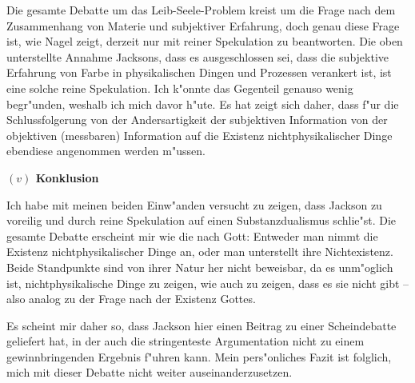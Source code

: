 \documentclass[a4paper, emulatestandardclasses, 12pt]{scrartcl}
\begin{document}
\begin{onehalfspace}
Die gesamte Debatte um das Leib-Seele-Problem kreist um die Frage nach dem Zusammenhang von Materie und subjektiver Erfahrung, doch genau diese Frage ist, wie Nagel zeigt, derzeit nur mit reiner Spekulation zu beantworten. Die oben unterstellte Annahme Jacksons, dass es ausgeschlossen sei, dass die subjektive Erfahrung von Farbe in physikalischen Dingen und Prozessen verankert ist, ist eine solche reine Spekulation. Ich k"onnte das Gegenteil genauso wenig begr"unden, weshalb ich mich davor h"ute. Es hat zeigt sich daher, dass f"ur die Schlussfolgerung von der Andersartigkeit der subjektiven Information von der objektiven (messbaren) Information auf die Existenz nichtphysikalischer Dinge ebendiese angenommen werden m"ussen. 


\vspace{5mm}
\noindent\textbf{$(v)$ Konklusion}

\noindent Ich habe mit meinen beiden Einw"anden versucht zu zeigen, dass Jackson zu voreilig und durch reine Spekulation auf einen Substanzdualismus schlie"st. Die gesamte Debatte erscheint mir wie die nach Gott: Entweder man nimmt die Existenz nichtphysikalischer Dinge an, oder man unterstellt ihre Nichtexistenz. Beide Standpunkte sind von ihrer Natur her nicht beweisbar, da es unm"oglich ist, nichtphysikalische Dinge zu zeigen, wie auch zu zeigen, dass es sie nicht gibt -- also analog zu der Frage nach der Existenz Gottes. 

Es scheint mir daher so, dass Jackson hier einen Beitrag zu einer Scheindebatte geliefert hat, in der auch die stringenteste Argumentation nicht zu einem gewinnbringenden Ergebnis f"uhren kann. Mein pers"onliches Fazit ist folglich, mich mit dieser Debatte nicht weiter auseinanderzusetzen.




\end{onehalfspace}

\end{document}
